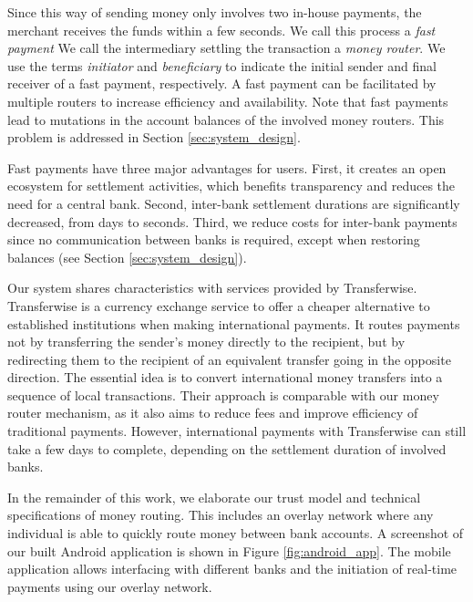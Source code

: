 Since this way of sending money only involves two in-house payments, the merchant receives the funds within a few seconds.
We call this process a \emph{fast payment}
We call the intermediary settling the transaction a \emph{money router}.
We use the terms \emph{initiator} and \emph{beneficiary} to indicate the initial sender and final receiver of a fast payment, respectively.
A fast payment can be facilitated by multiple routers to increase efficiency and availability.
Note that fast payments lead to mutations in the account balances of the involved money routers.
This problem is addressed in Section \ref{sec:system_design}.

Fast payments have three major advantages for users.
First, it creates an open ecosystem for settlement activities, which benefits transparency and reduces the need for a central bank.
Second, inter-bank settlement durations are significantly decreased, from days to seconds. %
Third, we reduce costs for inter-bank payments since no communication between banks is required, except when restoring balances (see Section \ref{sec:system_design}).

Our system shares characteristics with services provided by Transferwise.
Transferwise is a currency exchange service to offer a cheaper alternative to established institutions when making international payments.
It routes payments not by transferring the sender's money directly to the recipient, but by redirecting them to the recipient of an equivalent transfer going in the opposite direction.
The essential idea is to convert international money transfers into a sequence of local transactions.
Their approach is comparable with our money router mechanism, as it also aims to reduce fees and improve efficiency of traditional payments.
However, international payments with Transferwise can still take a few days to complete, depending on the settlement duration of involved banks.

In the remainder of this work, we elaborate our trust model and technical specifications of money routing.
This includes an overlay network where any individual is able to quickly route money between bank accounts.
A screenshot of our built Android application is shown in Figure \ref{fig:android_app}.
The mobile application allows interfacing with different banks and the initiation of real-time payments using our overlay network.

